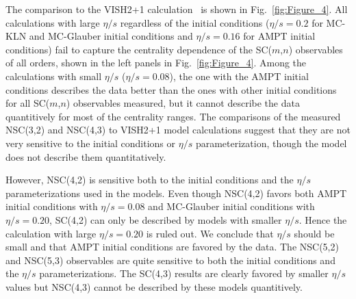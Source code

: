 The comparison to the VISH2+1 calculation~\cite{Zhu:2016puf} is shown in Fig.~\ref{fig:Figure_4}.  All calculations with large $\eta/s$ regardless of the initial conditions ($\eta/s=0.2$ for MC-KLN and MC-Glauber initial conditions and $\eta/s=0.16$ for AMPT initial conditions) fail to capture the centrality dependence of the SC($m$,$n$) observables of all orders, shown in the left panels in Fig.~\ref{fig:Figure_4}.
Among the calculations with small $\eta/s$ ($\eta/s=0.08$), the one with the AMPT initial conditions describes the data better than the ones with other initial conditions for all SC($m$,$n$) observables measured, but it cannot describe the data quantitively for most of the centrality ranges.
The comparisons of the measured NSC(3,2) and NSC(4,3) to VISH2+1 model calculations suggest that they are not very sensitive to the initial conditions or $\eta/s$ parameterization, though the model does not describe them quantitatively.

However, NSC(4,2) is sensitive both to the initial conditions and the $\eta/s$ parameterizations used in the models.
Even though NSC(4,2) favors both AMPT initial conditions with $\eta/s=0.08$ and MC-Glauber initial conditions with $\eta/s=0.20$,
SC(4,2) can only be described by models with smaller $\eta/s$. Hence the calculation with large $\eta/s=0.20$ is ruled out. We conclude that $\eta/s$ should be small and that AMPT initial conditions are favored by the data.
The NSC(5,2) and NSC(5,3) observables are quite sensitive to both the initial conditions and the $\eta/s$ parameterizations.
The SC(4,3) results are clearly favored by smaller $\eta/s$ values but NSC(4,3) cannot be described by these models quantitively.

